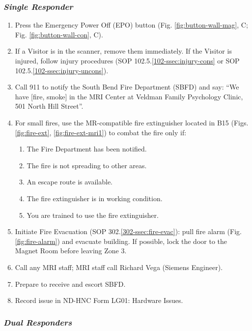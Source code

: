 \documentclass[11pt]{article}
\begin{document}
\subsubsection*{\textit{Single Responder}}

\begin{enumerate}
	\item Press the Emergency Power Off (EPO) button (Fig. \ref{fig:button-wall-mag}, C; Fig. \ref{fig:button-wall-con}, C).
	\item If a Visitor is in the scanner, remove them immediately. If the Visitor is injured, follow injury procedures (SOP 102.5.\ref{102-ssec:injury-cons} or SOP 102.5.\ref{102-ssec:injury-uncons}).
	\item Call 911 to notify the South Bend Fire Department (SBFD) and say: ``We have [fire, smoke] in the MRI Center at Veldman Family Psychology Clinic, 501 North Hill Street''.
	\item For small fires, use the MR-compatible fire extinguisher located in B15 (Figs. \ref{fig:fire-ext}, \ref{fig:fire-ext-mri1}) to combat the fire only if:
	\begin{enumerate}
        \item The Fire Department has been notified.
        \item The fire is not spreading to other areas.
        \item An escape route is available.
        \item The fire extinguisher is in working condition.
        \item You are trained to use the fire extinguisher.
    \end{enumerate}
	\item Initiate Fire Evacuation (SOP 302.\ref{302-ssec:fire-evac}): pull fire alarm (Fig. \ref{fig:fire-alarm}) and evacuate building. If possible, lock the door to the Magnet Room before leaving Zone 3.
	\item Call any MRI staff; MRI staff call Richard Vega (Siemens Engineer).
	\item Prepare to receive and escort SBFD.
	\item Record issue in ND-HNC Form LG01: Hardware Issues.
\end{enumerate}

\subsubsection*{\textit{Dual Responders}}
\end{document}
